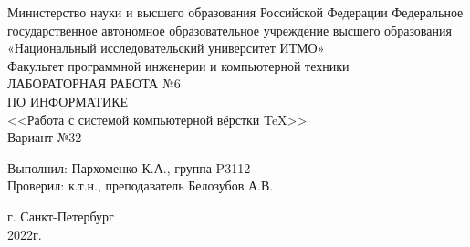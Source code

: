 \begin{center}
    

\large Министерство науки и высшего образования Российской Федерации
Федеральное государственное автономное образовательное учреждение высшего образования \\«Национальный исследовательский университет ИТМО» \\Факультет программной инженерии и компьютерной техники\\
\vspace*{\fill}
\LARGE ЛАБОРАТОРНАЯ РАБОТА №6\\ПО ИНФОРМАТИКЕ\\<<Работа с системой компьютерной вёрстки \TeX>>\\
\LARGE Вариант №32 \\
\end{center}
\vspace{10cm}
\begin{flushright}
  Выполнил: Пархоменко К.А., группа P3112\\
  Проверил: к.т.н., преподаватель Белозубов А.В.\\
\end{flushright}
\vspace{2cm}
\begin{center}
    г. Санкт-Петербург\\
    2022г.
\end{center}